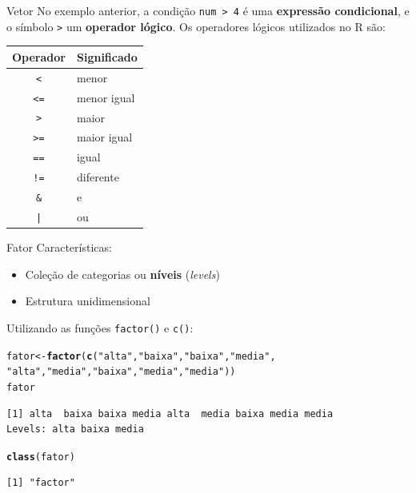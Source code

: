 \documentclass[10pt,handout]{beamer}\usepackage[]{graphicx}\usepackage[]{color}
\makeatletter
\newcommand{\hlstr}[1]{\textcolor[rgb]{0.192,0.494,0.8}{#1}}%
\newcommand{\hlstd}[1]{\textcolor[rgb]{0.345,0.345,0.345}{#1}}%
\newcommand{\hlkwb}[1]{\textcolor[rgb]{0.69,0.353,0.396}{#1}}%
\newcommand{\hlkwd}[1]{\textcolor[rgb]{0.737,0.353,0.396}{\textbf{#1}}}%
\newenvironment{kframe}{%
 \def\at@end@of@kframe{}%
 \ifinner\ifhmode%
  \def\at@end@of@kframe{\end{minipage}}%
  \begin{minipage}{\columnwidth}%
 \fi\fi%
 \def\FrameCommand##1{\hskip\@totalleftmargin \hskip-\fboxsep
 \colorbox{shadecolor}{##1}\hskip-\fboxsep
     \hskip-\linewidth \hskip-\@totalleftmargin \hskip\columnwidth}%
 \MakeFramed {\advance\hsize-\width
   \@totalleftmargin\z@ \linewidth\hsize
   \@setminipage}}%
 {\par\unskip\endMakeFramed%
 \at@end@of@kframe}
\newenvironment{knitrout}{}{} %
\makeatother
\begin{document}
\begin{frame}[fragile]{Vetor}
No exemplo anterior, a condição \texttt{num > 4} é uma
\textbf{expressão condicional}, e o símbolo \texttt{>} um
\textbf{operador lógico}. Os operadores lógicos utilizados no R são:

\begin{table}[!ht]
    \centering
        \begin{tabular}{cl}
        \hline
        \multicolumn{0}{c}{Operador} & \multicolumn{1}{c}{Significado} \\
        \hline
        \verb|<| & menor \\
        \verb|<=| & menor igual \\
        \verb|>| & maior \\
        \verb|>=| & maior igual \\
        \verb|==| & igual \\
        \verb|!=| & diferente \\
        \verb|&| & e \\
        \verb+|+ & ou \\
        \hline
        \end{tabular}
\end{table}
\end{frame}

\begin{frame}[fragile]{Fator}
Características:
\begin{itemize}
\item Coleção de categorias ou \textbf{níveis} (\emph{levels})
\item Estrutura unidimensional
\end{itemize}
Utilizando as funções \texttt{factor()} e \texttt{c()}:
\begin{knitrout}\small
{}\color{fgcolor}\begin{kframe}
\begin{alltt}
\hlstd{fator} \hlkwb{<-} \hlkwd{factor}\hlstd{(}\hlkwd{c}\hlstd{(}\hlstr{"alta"}\hlstd{,}\hlstr{"baixa"}\hlstd{,}\hlstr{"baixa"}\hlstd{,}\hlstr{"media"}\hlstd{,}
                  \hlstr{"alta"}\hlstd{,}\hlstr{"media"}\hlstd{,}\hlstr{"baixa"}\hlstd{,}\hlstr{"media"}\hlstd{,}\hlstr{"media"}\hlstd{))}
\hlstd{fator}
\end{alltt}
\begin{verbatim}
[1] alta  baixa baixa media alta  media baixa media media
Levels: alta baixa media
\end{verbatim}
\begin{alltt}
\hlkwd{class}\hlstd{(fator)}
\end{alltt}
\begin{verbatim}
[1] "factor"
\end{verbatim}
\end{kframe}
\end{knitrout}
\end{frame}
\end{document}
